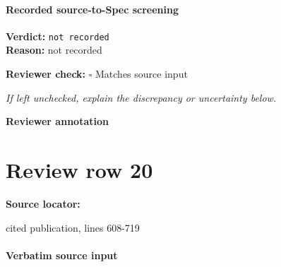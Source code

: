 \documentclass[10pt]{article}
\newcommand{\reviewerbox}{%
  \par\noindent\fbox{\parbox{0.96\linewidth}{\rule{0pt}{0.38in}}}\par
}
\newcommand{\reviewmatch}[1]{%
  \par\noindent\textbf{Reviewer check:} $\square$\; #1\par
  \noindent\emph{If left unchecked, explain the discrepancy or uncertainty below.}\par
}
\begin{document}
\paragraph{Recorded source-to-Spec screening}
\textbf{Verdict:} \texttt{not recorded}
\\
\textbf{Reason:} not recorded
\reviewmatch{Matches source input}
\noindent\textbf{Reviewer annotation}\par
\reviewerbox
\clearpage
\hypertarget{source-claim-d5233a0704a90fbf}{}
\section*{Review row 20}
\textbf{Source locator:} {\footnotesize\raggedright cited publication, lines 608-\allowbreak{}719\par}
\paragraph{Verbatim source input}
\end{document}
